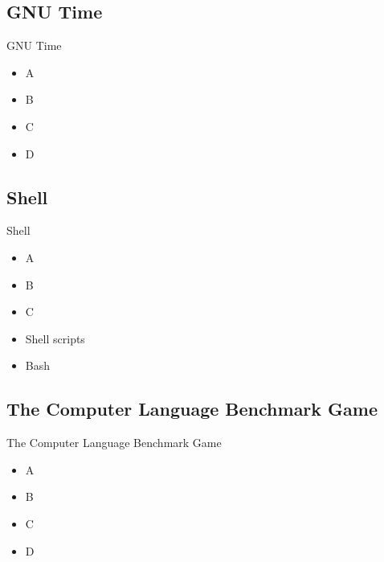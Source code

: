 \subsection{GNU Time}
\begin{frame}{GNU Time}
    \begin{itemize}
        \item A
        \item B
        \item C 
        \item D 
    \end{itemize}
\end{frame}

\subsection{Shell}
\begin{frame}{Shell}
    \begin{itemize}
        \item A
        \item B
        \item C 
        \item Shell scripts
        \item Bash
    \end{itemize}
\end{frame}

\subsection{The Computer Language Benchmark Game}
\begin{frame}{The Computer Language Benchmark Game}
    \begin{itemize}
        \item A
        \item B
        \item C 
        \item D 
    \end{itemize}
\end{frame}

